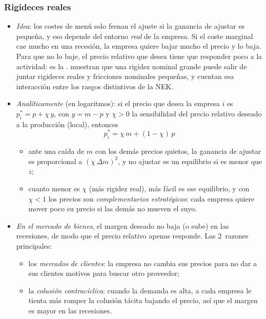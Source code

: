 \documentclass[11pt]{article}
\begin{document}
\subsubsection{Rigideces reales}\label{sec:rigideces-reales}

\begin{itemize}
\item \emph{Idea}: los costes de menú solo frenan el ajuste si la ganancia de ajustar es pequeña, y eso depende del entorno \emph{real} de la empresa. Si el coste marginal cae mucho en una recesión, la empresa quiere bajar mucho el precio y lo baja. Para que no lo baje, el precio relativo que desea tiene que responder poco a la actividad: es la . \textcite{BallRomer1990Real} muestran que una rigidez nominal grande puede salir de juntar rigideces reales y fricciones nominales pequeñas, y \textcite{MankiwRomer1991New} cuentan esa interacción entre los rasgos distintivos de la NEK.
\item \emph{Analíticamente} (en logaritmos): si el precio que desea la empresa $i$ es $p^*_i=p+\chi\,y$, con $y=m-p$ y $\chi>0$ la sensibilidad del precio relativo deseado a la producción (local), entonces
  \begin{equation}
  p^*_i=\chi\,m+(1-\chi)\,p \label{eq:ball-romer}
  \end{equation}
  \begin{itemize}
  \item ante una caída de $m$ con los demás precios quietos, la ganancia de ajustar es proporcional a $(\chi\,\Delta m)^2$, y no ajustar es un equilibrio si es menor que $z$;
  \item cuanto menor es $\chi$ (más rigidez real), más fácil es ese equilibrio, y con $\chi<1$ los precios son \emph{complementarios estratégicos}: cada empresa quiere mover poco su precio si las demás no mueven el suyo\nocite{Romer2019Advanced}.
  \end{itemize}
\item \emph{En el mercado de bienes}, el margen deseado no baja (o sube) en las recesiones, de modo que el precio relativo apenas responde. Las 2~razones principales:
  \begin{itemize}
  \item los \emph{mercados de clientes}: la empresa no cambia sus precios para no dar a sus clientes motivos para buscar otro proveedor\nocite{Okun1975Inflation,Okun1981Prices};
  \item la \emph{colusión contracíclica}: cuando la demanda es alta, a cada empresa le tienta más romper la colusión tácita bajando el precio, así que el margen es mayor en las recesiones\nocite{RotembergSaloner1986Supergame,RotembergWoodford1991Markups}.

\end{itemize}
\end{itemize}
\end{document}
